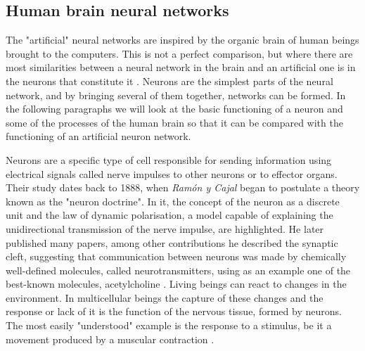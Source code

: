 \subsection{Human brain neural networks}


The "artificial" neural networks are inspired by the organic brain of human beings brought to the computers. This is not a perfect comparison, but where there are most similarities between a neural network in the brain and an artificial one is in the neurons that constitute it \cite{kinsley}. Neurons are the simplest parts of the neural network, and by bringing several of them together, networks can be formed. In the following paragraphs we will look at the basic functioning of a neuron and some of the processes of the human brain so that it can be compared with the functioning of an artificial neuron network.
\newline



Neurons are a specific type of cell responsible for sending information using electrical signals called nerve impulses to other neurons or to effector organs. Their study dates back to 1888, when \textit{Ramón y Cajal} began to postulate a theory known as the "neuron doctrine"\cite{cajal}. In it, the concept of the neuron as a discrete unit and the law of dynamic polarisation, a model capable of explaining the unidirectional transmission of the nerve impulse, are highlighted. He later published many papers, among other contributions he described the synaptic cleft, suggesting that communication between neurons was made by chemically well-defined molecules, called neurotransmitters, using as an example one of the best-known molecules, acetylcholine \cite{loewi}. Living beings can react to changes in the environment. In multicellular beings the capture of these changes and the response or lack of it is the function of the nervous tissue, formed by neurons. The most easily "understood" example is the response to a stimulus, be it a movement produced by a muscular contraction \cite{robertis}.
\newline

